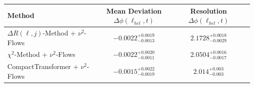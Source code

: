     \begin{tabular}{lccc}
        \toprule
        Method & Mean Deviation $\Delta\phi(\ell_{hel}, t)$ & Resolution $\Delta\phi(\ell_{hel}, t)$ \\
        \midrule
        $\Delta R(\ell,j)$-Method + $\nu^2$-Flows & $-0.0022^{+0.0019}_{-0.0013}$ & $2.1728^{+0.0018}_{-0.0029}$ \\
        $\chi^2$-Method + $\nu^2$-Flows & $-0.0022^{+0.0020}_{-0.0011}$ & $2.0504^{+0.0016}_{-0.0017}$ \\
        CompactTransformer + $\nu^2$-Flows & $-0.0015^{+0.0022}_{-0.0019}$ & $2.014^{+0.003}_{-0.003}$ \\
        \bottomrule
    \end{tabular}
